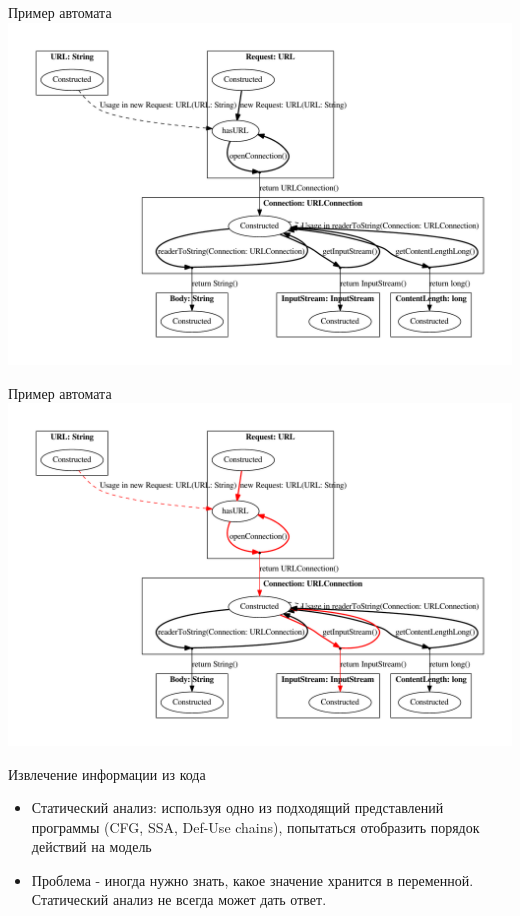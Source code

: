\documentclass[12pt]{beamer}
\begin{document}

\begin{frame}{Пример автомата}
	\includegraphics[width=\textwidth]{java.pdf}
\end{frame}

\begin{frame}{Пример автомата}
	\includegraphics[width=\textwidth]{extracted_java.pdf}
\end{frame}

\begin{frame}[fragile]{Извлечение информации из кода}
  \begin{mybox}[]
  \begin{itemize}
  	\item Статический анализ: используя одно из подходящий представлений программы (CFG, SSA, Def-Use chains), попытаться отобразить порядок действий на модель
  	\item Проблема - иногда нужно знать, какое значение хранится в переменной. Статический анализ не всегда может дать ответ.
  \end{itemize}
  \end{mybox}
\end{frame}
\end{document}

